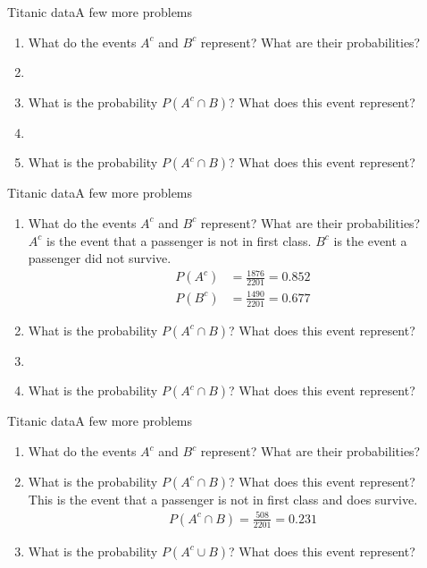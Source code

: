 \documentclass[xcolor=dvipsnames]{beamer}
\begin{document}
\begin{frame}{Titanic data}{A few more problems}
	\begin{enumerate}
		\item What do the events $A^c$ and $B^c$ represent? What are their probabilities?
		\item[]
		\item What is the probability $P(A^c \cap B)$? What does this event represent?
		\item[] 
		\item What is the probability $P(A^c \cap B)$? What does this event represent?
	\end{enumerate}
\end{frame}

\begin{frame}{Titanic data}{A few more problems}
\begin{enumerate}
	\item What do the events $A^c$ and $B^c$ represent? What are their probabilities?\\
	$A^c$ is the event that a passenger is not in first class. $B^c$ is the event a passenger did not survive. 
	\begin{align*}
		P(A^c) &= \frac{1876}{2201} = 0.852 \\
		P(B^c) &= \frac{1490}{2201} = 0.677
	\end{align*}
	\item What is the probability $P(A^c \cap B)$? What does this event represent?
	\item[] 
	\item What is the probability $P(A^c \cap B)$? What does this event represent?
\end{enumerate}
\end{frame}

\begin{frame}{Titanic data}{A few more problems}
\begin{enumerate}
	\item What do the events $A^c$ and $B^c$ represent? What are their probabilities?
	\item What is the probability $P(A^c \cap B)$? What does this event represent? \\
	This is the event that a passenger is not in first class and does survive.
	\begin{gather*}
		P(A^c \cap B) = \frac{508}{2201} = 0.231
	\end{gather*}
	\item What is the probability $P(A^c \cup B)$? What does this event represent?
\end{enumerate}
\end{frame}
\end{document}
